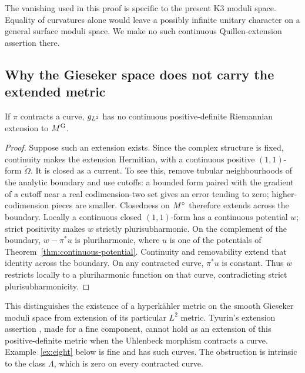 The vanishing used in this proof is specific to the present K3 moduli
space. Equality of curvatures alone would leave a possibly infinite
unitary character on a general surface moduli space. We make no such
continuous Quillen-extension assertion there.

\subsection{Why the Gieseker space does not carry the extended metric}

\begin{corollary}\label{cor:nonextension}
If $\pi$ contracts a curve, $g_{L^2}$ has no continuous positive-definite
Riemannian extension to $M^{\mathrm G}$.
\end{corollary}
\begin{proof}
Suppose such an extension exists. Since the complex structure is fixed,
continuity makes the extension Hermitian, with a continuous positive
$(1,1)$-form $\widetilde\Omega$. It is closed as a current. To see this,
remove tubular neighbourhoods of the analytic boundary and use cutoffs:
a bounded form paired with the gradient of a cutoff near a real
codimension-two set gives an error tending to zero; higher-codimension
pieces are smaller. Closedness on $M^{\circ}$ therefore extends across the
boundary.
Locally a continuous closed $(1,1)$-form has a continuous potential $w$;
strict positivity makes $w$ strictly plurisubharmonic. On the complement
of the boundary, $w-\pi^*u$ is pluriharmonic, where $u$ is one of the
potentials of Theorem~\ref{thm:continuous-potential}. Continuity and
removability extend that identity across the boundary. On any contracted
curve, $\pi^*u$ is constant. Thus $w$ restricts locally to a pluriharmonic
function on that curve, contradicting strict plurisubharmonicity.
\end{proof}

This distinguishes the existence of a hyperk\"ahler metric on the smooth
Gieseker moduli space from extension of its particular $L^2$ metric.
Tyurin's extension assertion \cite[Theorem~2]{Tyu92}, made for a fine
component, cannot hold as an extension of this positive-definite metric
when the Uhlenbeck morphism contracts a curve. Example~\ref{ex:eight}
below is fine and has such curves. The obstruction is intrinsic to the
class $\Lambda$, which is zero on every contracted curve.
